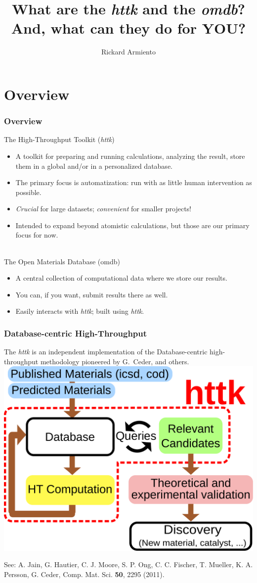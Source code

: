 \documentclass[dvipsnames]{beamer}
\title[httk and omdb]{What are the \emph{httk} and the \emph{omdb}?\\And, what can they do for YOU?}
\author{Rickard Armiento} %
\institute[LiU]{Link{\"o}ping University, Sweden} %
\begin{document}
\begin{frame}
\titlepage 
\end{frame}

\section{Overview}
\begin{frame}
\frametitle{Overview}
{\color{blue} The High-Throughput Toolkit (\emph{httk})}
\begin{itemize}
\item A toolkit for {\color{red}preparing} and {\color{red}running} calculations, {\color{red}analyzing} the result,  {\color{red}store them in a global and/or in a personalized database.}
\item The primary focus is {\color{red} automatization:} run with as little human intervention as possible.
\item \emph{Crucial} for large datasets; \emph{convenient} for smaller projects!
\item Intended to expand beyond atomistic calculations, but those are our primary focus for now.
\end{itemize}\strut\\[0.2cm]

{\color{blue}The Open Materials Database (omdb)}
\begin{itemize}
\item A central collection of computational data where we store our results.
\item You can, if you want, submit results there as well.
\item Easily interacts with \emph{httk}; built using \emph{httk}.
\end{itemize}
\end{frame}

\begin{frame}
\frametitle{Database-centric High-Throughput}
The \emph{httk} is an independent implementation of the Database-centric high-throughput methodology pioneered by G.\ Ceder, and others.\\[0.2cm]
{\scriptsize\centering\includegraphics[width=0.6\linewidth]{flowchart_databasedriven_ht.pdf}\\[0.5cm]}

\raggedright See: A. Jain, G. Hautier, C. J. Moore, S. P. Ong, C. C. Fischer, T. Mueller, K. A. Persson, G. Ceder, Comp. Mat. Sci. \textbf{50}, 2295 (2011).\\
\end{frame}
\end{document}
